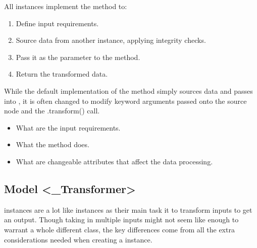 \documentclass[letterpaper,10pt,english]{sphinxmanual}
\begin{document}
All  instances implement the  method to:
\begin{enumerate}
%
\item {} 
Define input requirements.

\item {} 
Source data from another  instance, applying integrity checks.

\item {} 
Pass it as the  parameter to the  method.

\item {} 
Return the transformed data.

\end{enumerate}

While the default implementation of the  method simply sources data and passes into , it is often changed to modify keyword arguments passed onto the source node and the .transform() call.

\begin{itemize}
\item {} 
What are the input requirements.

\item {} 
What the  method does.

\item {} 
What are changeable attributes that affect the data processing.

\end{itemize}


\subsection{Model \textless{}\_Transformer\textgreater{}}
\label{\detokenize{beginners-guide:model-transformer}}


 instances are a lot like  instances as their main task it to transform inputs to get an output. Though taking in multiple inputs might not seem like enough to warrant a whole different class, the key differences come from all the extra considerations needed when creating a  instance.
\end{document}
